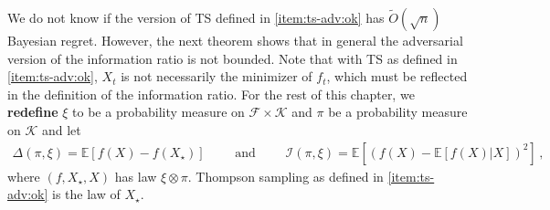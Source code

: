 \documentclass[letter, 12pt]{report}
\newcommand{\E}{\mathbb E}
\newcommand{\cK}{\mathcal K}
\newcommand{\sF}{\mathscr F}
\newcommand{\I}{\mathcal{I}}
\newcommand{\1}{\mathbf{1}}
\newcommand{\ts}{\textsc{TS}\xspace}
\theoremstyle{plain}
\theoremstyle{definition}
\theoremstyle{remark}
\begin{document}
We do not know if the version of \ts{} defined in \ref{item:ts-adv:ok} has $\tilde O(\sqrt{n})$ Bayesian regret.
However, the next theorem shows that in general the adversarial version of the information ratio is not bounded.
Note that with \ts as defined in \ref{item:ts-adv:ok}, $X_t$ is not necessarily the minimizer of $f_t$,
which must be reflected in the definition of the information ratio.
For the rest of this chapter, we \textbf{redefine} $\xi$ to be a probability measure on $\sF \times \cK$ and $\pi$ be a probability measure on $\cK$ and let
\begin{align*}
    \Delta(\pi, \xi) = \E[f(X) - f(X_\star)]  \qquad \text{ and } \qquad
    \I(\pi, \xi) = \E[(f(X) - \E[f(X)|X])^2]\,,
\end{align*}
where $(f, X_\star, X)$ has law $\xi \otimes \pi$.
Thompson sampling as defined in \ref{item:ts-adv:ok} is the law of $X_\star$.
\end{document}
